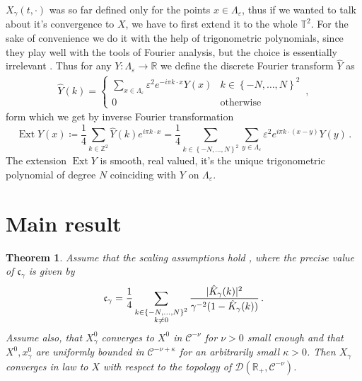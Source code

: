 \documentclass{report}
\newcommand{\ZZ}{\mathbb{Z}}
\newcommand{\RR}{\mathbb{R}}
\newcommand{\TT}{\mathbb{T}}
\DeclarePairedDelimiter\abs{\lvert}{\rvert} %
\DeclareMathOperator{\DefiningEquality}{\coloneqq}
\DeclareMathOperator{\Ext}{Ext}
\newtheorem{theorem}{Theorem}[chapter]
\theoremstyle{remark}
\theoremstyle{definition}
\newcommand{\TODO}[1]{\text{\textcolor{red}{TODO: #1}}\xspace}
\let\epsilon\varepsilon
\begin{document}
$X_\gamma(t, \cdot)$ was so far defined only for the points $x \in \Lambda_\epsilon$, thus if we wanted to talk about it's convergence to $X$, we have to first extend it to the whole $\TT^2$. For the sake of convenience we do it with the help of trigonometric polynomials, since they play well with the tools of Fourier analysis, but the choice is essentially irrelevant \cite{mourrat2015convergencetwodimensionaldynamicisingkac}. Thus for any $Y: \Lambda_\epsilon \to \RR$ we define the discrete Fourier transform $\hat{Y}$ as \begin{align}
  \hat{Y}(k) = \begin{cases}
      \sum_{x \in \Lambda_\epsilon} \epsilon^2 e^{- i \pi k \cdot x} Y(x)&k \in \left\{-N, \ldots, N\right\}^2\\
      0&\text{otherwise}
  \end{cases}\,,
\end{align}
form which we get by inverse Fourier transformation $$\Ext Y(x) \DefiningEquality \frac{1}{4} \sum_{k \in \ZZ^2} \hat{Y}(k) e^{i \pi k \cdot x} = \frac{1}{4} \sum_{k \in \left\{-N, \dots, N\right\}^2} \sum_{y \in \Lambda_\epsilon}\epsilon^2 e^{i \pi k \cdot (x -y)} Y(y)\,.$$
The extension $\Ext Y$ is smooth, real valued, it's the unique trigonometric polynomial of degree $N$ coinciding with $Y$ on $\Lambda_\epsilon$.


\section{Main result}

\begin{theorem}
  Assume that the scaling assumptions hold \TODO{which scaling assumptions?}, where the precise value of $\mathfrak{c}_\gamma$ is given by\begin{align}
    \mathfrak{c}_\gamma = \frac{1}{4}\sum_{\substack{k \in \left\{-N, \ldots, N\right\}^2\\k\neq 0}}\frac{\abs{\hat{K}_\gamma(k)}^2}{\gamma^{-2} (1 - \hat{K}_\gamma(k))}\,.
  \end{align}
  Assume also, that $X^0_\gamma$ converges to $X^0$ in $\mathcal{C}^{-\nu}$ for $\nu > 0$ small enough and that $X^0, x^0_\gamma$ are uniformly bounded in $\mathcal{C}^{-\nu + \kappa}$ for an arbitrarily small $\kappa > 0$. Then $X_\gamma$ converges in law to $X$ with respect to the topology of $\mathcal{D}(\RR_+, \mathcal{C}^{-\nu})$.
\end{theorem}
\TODO{rough sketch of the proof idea}
\end{document}
